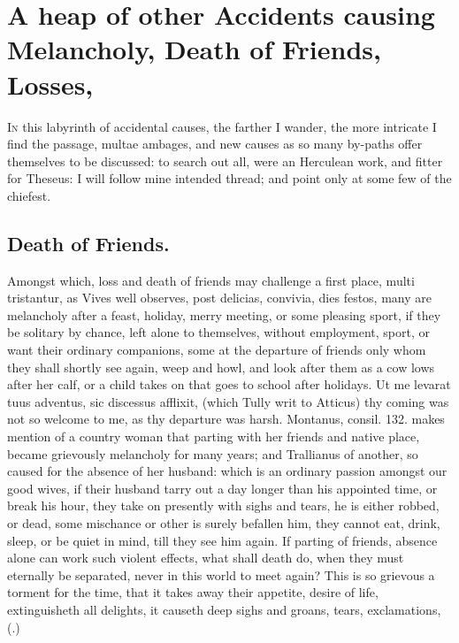 {\section[Accidents, Death of Friends, Losses]{A heap of other Accidents causing Melancholy, Death of Friends, Losses, \etc{}}\label{sec:accidents-death-of-friends}

\lettrine{I}{n} this labyrinth of accidental causes, the farther I wander, the more
intricate I find the passage, multae ambages, and new causes as so many
by-paths offer themselves to be discussed: to search out all, were an
Herculean work, and fitter for Theseus: I will follow mine intended
thread; and point only at some few of the chiefest.
\subsection{Death of Friends.}
Amongst which, loss and death of friends may
challenge a first place, multi tristantur, as Vives well
observes, post delicias, convivia, dies festos, many are melancholy
after a feast, holiday, merry meeting, or some pleasing sport, if they
be solitary by chance, left alone to themselves, without employment,
sport, or want their ordinary companions, some at the departure of
friends only whom they shall shortly see again, weep and howl, and look
after them as a cow lows after her calf, or a child takes on that goes
to school after holidays. Ut me levarat tuus adventus, sic discessus
afflixit, (which Tully writ to Atticus) thy coming was not so
welcome to me, as thy departure was harsh. Montanus, consil. 132. makes
mention of a country woman that parting with her friends and native
place, became grievously melancholy for many years; and Trallianus of
another, so caused for the absence of her husband: which is an ordinary
passion amongst our good wives, if their husband tarry out a day longer
than his appointed time, or break his hour, they take on presently with
sighs and tears, he is either robbed, or dead, some mischance or other
is surely befallen him, they cannot eat, drink, sleep, or be quiet in
mind, till they see him again. If parting of friends, absence alone can
work such violent effects, what shall death do, when they must
eternally be separated, never in this world to meet again? This is so
grievous a torment for the time, that it takes away their appetite,
desire of life, extinguisheth all delights, it causeth deep sighs and
groans, tears, exclamations,
(.) 
}
